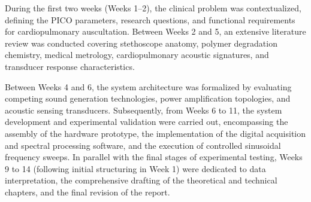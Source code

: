 \begin{table}[htbp]
\centering
\caption{Project execution schedule and task distribution.}
\label{tab:gantt_chart}
\setlength{\tabcolsep}{3.5pt} %
\renewcommand{\arraystretch}{1.4} %
\end{table}

During the first two weeks (Weeks 1--2), the clinical problem was contextualized, defining the PICO parameters, research questions, and functional requirements for cardiopulmonary auscultation. Between Weeks 2 and 5, an extensive literature review was conducted covering stethoscope anatomy, polymer degradation chemistry, medical metrology, cardiopulmonary acoustic signatures, and transducer response characteristics.

Between Weeks 4 and 6, the system architecture was formalized by evaluating competing sound generation technologies, power amplification topologies, and acoustic sensing transducers. Subsequently, from Weeks 6 to 11, the system development and experimental validation were carried out, encompassing the assembly of the hardware prototype, the implementation of the digital acquisition and spectral processing software, and the execution of controlled sinusoidal frequency sweeps. In parallel with the final stages of experimental testing, Weeks 9 to 14 (following initial structuring in Week 1) were dedicated to data interpretation, the comprehensive drafting of the theoretical and technical chapters, and the final revision of the report.

